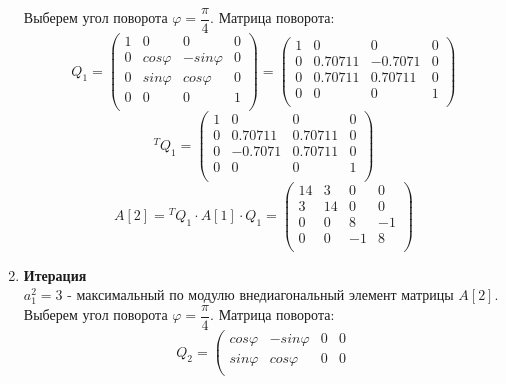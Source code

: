 \documentclass[12pt]{article}
\begin{document}
\begin{enumerate}[label=\textbf{\arabic*}]
Выберем угол поворота $\varphi = \dfrac\pi4$.
Матрица поворота:
\begin{equation*}
	Q_1 = \left(
	\begin{array}{cccc}
		1 & 0 & 0 & 0 \\
		0 & cos \varphi & -sin \varphi & 0 \\
		0 & sin \varphi & cos \varphi & 0 \\
		0 & 0 & 0 & 1 \\
	\end{array}
	\right)
	=
	\left(
	\begin{array}{cccc}
		1 & 0 & 0 & 0 \\
		0 & 0.70711 & -0.7071 & 0 \\
		0 & 0.70711 & 0.70711 & 0 \\
		0 & 0 & 0 & 1 \\
	\end{array}
	\right)
\end{equation*}
\begin{equation*}
	{}^T Q_1 = \left(
	\begin{array}{cccc}
		1 & 0 & 0 & 0 \\
		0 & 0.70711 & 0.70711 & 0 \\
		0 & -0.7071 & 0.70711 & 0 \\
		0 & 0 & 0 & 1 \\
	\end{array}
	\right)
\end{equation*}
\begin{equation*}
	A[2] = {}^T Q_1 \cdot A[1] \cdot Q_1 = \left(
	\begin{array}{cccc}
		14 & 3 & 0 & 0 \\
		3 & 14 & 0 & 0 \\
		0 & 0 & 8 & -1 \\
		0 & 0 & -1 & 8 \\
	\end{array}
	\right)
\end{equation*}
\item \textbf{Итерация} \\
$a_1^2=3$ - максимальный по модулю внедиагональный элемент матрицы $A[2]$. \\
Выберем угол поворота $\varphi = \dfrac\pi4$.
Матрица поворота:
\begin{equation*}
	Q_2 = \left(
	\begin{array}{cccc}
		cos \varphi & -sin \varphi & 0 & 0 \\
		sin \varphi & cos \varphi & 0 & 0 \\

\end{array}
\end{equation*}
\end{enumerate}
\end{document}

